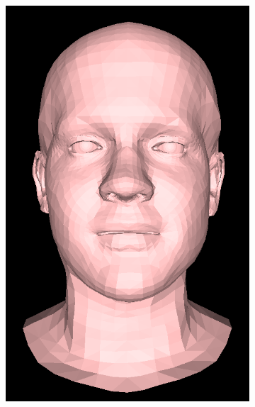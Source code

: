 \begin{figure}[h]
    \centering
    \begin{subfigure}[b]{0.24\textwidth}
        \includegraphics[width=\textwidth]{figures/blendshape_interp/4/00001.png}
    \end{subfigure}
    \begin{subfigure}[b]{0.24\textwidth}

\end{subfigure}
\end{figure}
